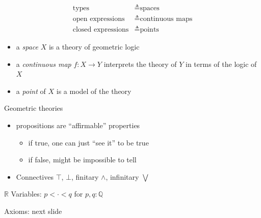 \documentclass[14pt, notes]{beamer}
\newcommand{\rat}{\mathbb{Q}}
\newcommand{\R}{\mathbb{R}}
\begin{document}
\begin{frame}

\begin{center}
\Large 
\begin{align*}
\text{types} &\triangleq \text{spaces}
\\
\text{open expressions} &\triangleq \text{continuous maps}
\\
\text{closed expressions} &\triangleq \text{points}
\end{align*}
\end{center}
\end{frame}

\begin{frame}
\begin{itemize}
\item a \emph{space} $X$ is a theory of geometric logic
\item a \emph{continuous map} $f : X \to Y$ interprets the theory of $Y$ in terms of the logic of $X$
\item a \emph{point} of $X$ is a model of the theory
\end{itemize}
\end{frame}

\begin{frame}{Geometric theories}
\begin{itemize}
\item propositions are ``affirmable'' properties
\begin{itemize}
  \item if true, one can just ``see it'' to be true
  \item if false, might be impossible to tell
\end{itemize} 
\item Connectives $\top$, $\bot$, finitary $\wedge$, infinitary $\bigvee$
\end{itemize}
\end{frame}

\begin{frame}{$\R$}
Variables: $p < \cdot < q$ for $p, q : \rat$

Axioms: next slide
\end{frame}
\end{document}
